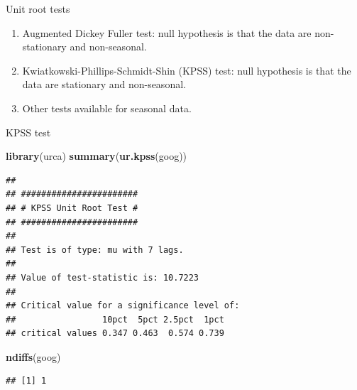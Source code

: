 \documentclass[14pt,ignorenonframetext,]{beamer}
\newenvironment{Shaded}{\begin{snugshade}}{\end{snugshade}}
\newcommand{\KeywordTok}[1]{\textcolor[rgb]{0.13,0.29,0.53}{\textbf{#1}}}
\newcommand{\NormalTok}[1]{#1}
\providecommand{\tightlist}{%
  \setlength{\itemsep}{0pt}\setlength{\parskip}{0pt}}
\begin{document}
\begin{frame}{Unit root tests}


\begin{enumerate}
\def\labelenumi{\arabic{enumi}.}
\tightlist
\item
  Augmented Dickey Fuller test: null hypothesis is that the data are
  non-stationary and non-seasonal.
\item
  Kwiatkowski-Phillips-Schmidt-Shin (KPSS) test: null hypothesis is that
  the data are stationary and non-seasonal.
\item
  Other tests available for seasonal data.
\end{enumerate}

\end{frame}

\begin{frame}[fragile]{KPSS test}

\fontsize{10}{11}\sf

\begin{Shaded}
\begin{Highlighting}[]
\KeywordTok{library}\NormalTok{(urca)}
\KeywordTok{summary}\NormalTok{(}\KeywordTok{ur.kpss}\NormalTok{(goog))}
\end{Highlighting}
\end{Shaded}

\begin{verbatim}
## 
## ####################### 
## # KPSS Unit Root Test # 
## ####################### 
## 
## Test is of type: mu with 7 lags. 
## 
## Value of test-statistic is: 10.7223 
## 
## Critical value for a significance level of: 
##                 10pct  5pct 2.5pct  1pct
## critical values 0.347 0.463  0.574 0.739
\end{verbatim}

\pause

\begin{Shaded}
\begin{Highlighting}[]
\KeywordTok{ndiffs}\NormalTok{(goog)}
\end{Highlighting}
\end{Shaded}

\begin{verbatim}
## [1] 1
\end{verbatim}

\end{frame}
\end{document}
